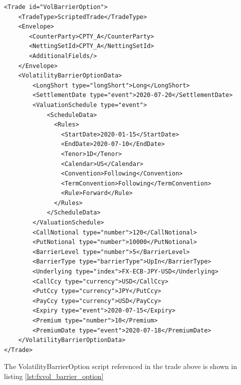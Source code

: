 \begin{verbatim}
<Trade id="VolBarrierOption">
    <TradeType>ScriptedTrade</TradeType>
  	<Envelope>
  	   <CounterParty>CPTY_A</CounterParty>
  	   <NettingSetId>CPTY_A</NettingSetId>
  	   <AdditionalFields/>
  	</Envelope>
  	<VolatilityBarrierOptionData>
        <LongShort type="longShort">Long</LongShort>
        <SettlementDate type="event">2020-07-20</SettlementDate>
        <ValuationSchedule type="event">
            <ScheduleData>
              <Rules>
                <StartDate>2020-01-15</StartDate>
                <EndDate>2020-07-10</EndDate>
                <Tenor>1D</Tenor>
                <Calendar>US</Calendar>
                <Convention>Following</Convention>
                <TermConvention>Following</TermConvention>
                <Rule>Forward</Rule>
              </Rules>
            </ScheduleData>
        </ValuationSchedule>
        <CallNotional type="number">120</CallNotional>
        <PutNotional type="number">10000</PutNotional>
        <BarrierLevel type="number">5</BarrierLevel>
        <BarrierType type="barrierType">UpIn</BarrierType>
        <Underlying type="index">FX-ECB-JPY-USD</Underlying>
        <CallCcy type="currency">USD</CallCcy>
        <PutCcy type="currency">JPY</PutCcy>
        <PayCcy type="currency">USD</PayCcy>
        <Expiry type="event">2020-07-15</Expiry>
        <Premium type="number">10</Premium>
        <PremiumDate type="event">2020-07-18</PremiumDate>
    </VolatilityBarrierOptionData>
</Trade>
\end{verbatim}

The VolatilityBarrierOption script referenced in the trade above is shown in listing
\ref{lst:fxvol_barrier_option}

